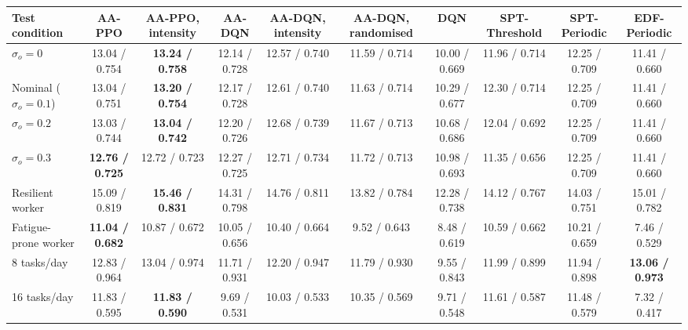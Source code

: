 \begin{tabular}{lccccccccc}
\toprule
Test condition & AA-PPO & AA-PPO, intensity & AA-DQN & AA-DQN, intensity & AA-DQN, randomised & DQN & SPT-Threshold & SPT-Periodic & EDF-Periodic \\
\midrule
$\sigma_o=0$ & 13.04 / 0.754 & \textbf{13.24 / 0.758} & 12.14 / 0.728 & 12.57 / 0.740 & 11.59 / 0.714 & 10.00 / 0.669 & 11.96 / 0.714 & 12.25 / 0.709 & 11.41 / 0.660 \\
Nominal ($\sigma_o=0.1$) & 13.04 / 0.751 & \textbf{13.20 / 0.754} & 12.17 / 0.728 & 12.61 / 0.740 & 11.63 / 0.714 & 10.29 / 0.677 & 12.30 / 0.714 & 12.25 / 0.709 & 11.41 / 0.660 \\
$\sigma_o=0.2$ & 13.03 / 0.744 & \textbf{13.04 / 0.742} & 12.20 / 0.726 & 12.68 / 0.739 & 11.67 / 0.713 & 10.68 / 0.686 & 12.04 / 0.692 & 12.25 / 0.709 & 11.41 / 0.660 \\
$\sigma_o=0.3$ & \textbf{12.76 / 0.725} & 12.72 / 0.723 & 12.27 / 0.725 & 12.71 / 0.734 & 11.72 / 0.713 & 10.98 / 0.693 & 11.35 / 0.656 & 12.25 / 0.709 & 11.41 / 0.660 \\
Resilient worker & 15.09 / 0.819 & \textbf{15.46 / 0.831} & 14.31 / 0.798 & 14.76 / 0.811 & 13.82 / 0.784 & 12.28 / 0.738 & 14.12 / 0.767 & 14.03 / 0.751 & 15.01 / 0.782 \\
Fatigue-prone worker & \textbf{11.04 / 0.682} & 10.87 / 0.672 & 10.05 / 0.656 & 10.40 / 0.664 & 9.52 / 0.643 & 8.48 / 0.619 & 10.59 / 0.662 & 10.21 / 0.659 & 7.46 / 0.529 \\
8 tasks/day & 12.83 / 0.964 & 13.04 / 0.974 & 11.71 / 0.931 & 12.20 / 0.947 & 11.79 / 0.930 & 9.55 / 0.843 & 11.99 / 0.899 & 11.94 / 0.898 & \textbf{13.06 / 0.973} \\
16 tasks/day & 11.83 / 0.595 & \textbf{11.83 / 0.590} & 9.69 / 0.531 & 10.03 / 0.533 & 10.35 / 0.569 & 9.71 / 0.548 & 11.61 / 0.587 & 11.48 / 0.579 & 7.32 / 0.417 \\
\bottomrule
\end{tabular}